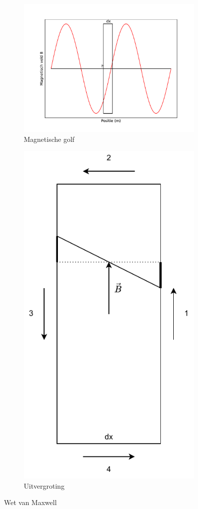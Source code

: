 \documentclass[a4paper,kul]{kulakarticle} %
\begin{document}
\begin{figure}[h]
	\centering
	\begin{subfigure}{.5\textwidth}
		\centering
		\includegraphics[width=1\linewidth]{MaxwellGolf}
		\caption[Golf Maxwell]{Magnetische golf}
		\label{fig:maxwellgolf}
	\end{subfigure}%
	\begin{subfigure}{.5\textwidth}
		\centering
		\includegraphics[width=0.6\linewidth]{InzoomMaxwell}
		\caption[Inzoom maxwell]{Uitvergroting}
		\label{fig:inzoommaxwell}
	\end{subfigure}
	\caption{Wet van Maxwell}
	\label{fig:InductieMaxwell}
\end{figure}
\end{document}

